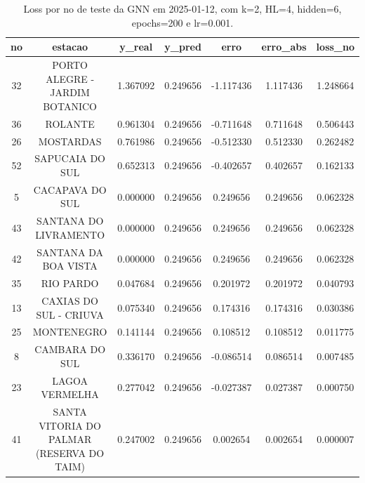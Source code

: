 \begin{table}[h]
\centering
\caption{Loss por no de teste da GNN em 2025-01-12, com k=2, HL=4, hidden=6, epochs=200 e lr=0.001.}
\label{tab:gnn_loss_k2_hl4_h6_e200_d20250112}
\begin{tabular}{ccccccc}
\toprule
no & estacao & y\_real & y\_pred & erro & erro\_abs & loss\_no \\
\midrule
32 & PORTO ALEGRE - JARDIM BOTANICO & 1.367092 & 0.249656 & -1.117436 & 1.117436 & 1.248664 \\
36 & ROLANTE & 0.961304 & 0.249656 & -0.711648 & 0.711648 & 0.506443 \\
26 & MOSTARDAS & 0.761986 & 0.249656 & -0.512330 & 0.512330 & 0.262482 \\
52 & SAPUCAIA DO SUL & 0.652313 & 0.249656 & -0.402657 & 0.402657 & 0.162133 \\
5 & CACAPAVA DO SUL & 0.000000 & 0.249656 & 0.249656 & 0.249656 & 0.062328 \\
43 & SANTANA DO LIVRAMENTO & 0.000000 & 0.249656 & 0.249656 & 0.249656 & 0.062328 \\
42 & SANTANA DA BOA VISTA & 0.000000 & 0.249656 & 0.249656 & 0.249656 & 0.062328 \\
35 & RIO PARDO & 0.047684 & 0.249656 & 0.201972 & 0.201972 & 0.040793 \\
13 & CAXIAS DO SUL - CRIUVA & 0.075340 & 0.249656 & 0.174316 & 0.174316 & 0.030386 \\
25 & MONTENEGRO & 0.141144 & 0.249656 & 0.108512 & 0.108512 & 0.011775 \\
8 & CAMBARA DO SUL & 0.336170 & 0.249656 & -0.086514 & 0.086514 & 0.007485 \\
23 & LAGOA VERMELHA & 0.277042 & 0.249656 & -0.027387 & 0.027387 & 0.000750 \\
41 & SANTA VITORIA DO PALMAR (RESERVA DO TAIM) & 0.247002 & 0.249656 & 0.002654 & 0.002654 & 0.000007 \\
\bottomrule
\end{tabular}
\end{table}
